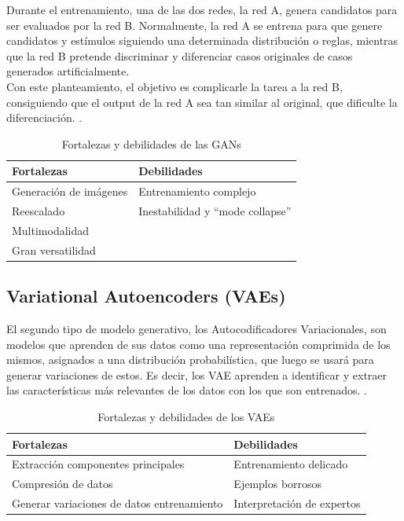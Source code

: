 Durante el entrenamiento, una de las dos redes, la red A, genera candidatos para ser evaluados por 
la red B. Normalmente, la red A se entrena para que genere candidatos y estímulos siguiendo una 
determinada distribución o reglas, mientras que la red B pretende discriminar y diferenciar casos 
originales de casos generados artificialmente.\\

Con este planteamiento, el objetivo es complicarle la tarea a la red B, consiguiendo que el output 
de la red A sea tan similar al original, que dificulte la diferenciación. \cite{xiao2022gan}.

\begin{table}[H]
\centering
\begin{tabularx}{\textwidth}{X|X}
    \textbf{Fortalezas} & \textbf{Debilidades} \\ \hline
    Generación de imágenes & Entrenamiento complejo \\ 
    Reescalado & Inestabilidad y ``mode collapse'' \\
    Multimodalidad & \\ 
    Gran versatilidad & \\ 
\end{tabularx}
\caption{Fortalezas y debilidades de las GANs}
\end{table}

\subsection{Variational Autoencoders (VAEs)}
El segundo tipo de modelo generativo, los Autocodificadores Variacionales, son modelos que aprenden 
de sus datos como una representación comprimida de los mismos, asignados a una distribución 
probabilística, que luego se usará para generar variaciones de estos. Es decir, los VAE aprenden a 
identificar y extraer las características más relevantes de los datos con los que son entrenados. \cite{moradzadeh2022vae}.\\

\begin{table}[H]
\centering
\begin{tabularx}{\textwidth}{X|X}
    \textbf{Fortalezas} & \textbf{Debilidades} \\ \hline
    Extracción componentes principales & Entrenamiento delicado \\ 
    Compresión de datos & Ejemplos borrosos \\ 
    Generar variaciones de datos entrenamiento & Interpretación de expertos \\ 
\end{tabularx}
\caption{Fortalezas y debilidades de los VAEs}
\end{table}

